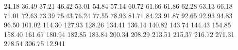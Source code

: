 24.18
36.49
37.21
46.42
53.01
54.84
57.14
60.72
61.66
61.86
62.28
63.13
66.18
71.01
72.63
73.39
75.43
76.24
77.55
78.93
81.71
84.23
91.87
92.65
92.93
94.83
96.50
101.02
114.30
127.93
128.26
134.41
136.14
140.82
143.74
144.43
154.85
158.40
161.67
180.94
182.85
183.84
200.34
208.29
213.51
215.37
216.72
271.31
278.54
306.75
12.941
